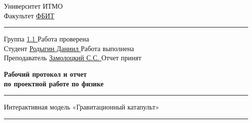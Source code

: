 \documentclass[12pt,a4paper]{article}
\begin{document}
\noindent
\begin{minipage}[t]{0.6\textwidth}
    \vspace{0pt}
    Университет ИТМО \\
    Факультет \underline{\hspace{0.6cm} ФБИТ \hspace{5.95cm}}
\end{minipage}%
\hfill%
\begin{minipage}[t]{0.3\textwidth}
    \vspace{-14pt}
    \centering
\end{minipage}
\rule{\textwidth}{1.5pt}
\vspace{0.01cm}

\noindent
Группа \underline{\hspace{1cm} 1.1 \hspace{2.85cm}} \hfill Работа проверена \underline{\hspace{4cm}}\\
Студент \underline{\hspace{0.2cm} Родыгин Даниил \hspace{0.2cm}} \hfill Работа выполнена \underline{\hspace{3.4cm}}\\
Преподаватель \underline{\hspace{0.935cm} Замолоцкий С.С. \hspace{1.5cm}} \hfill Отчет принят \underline{\hspace{4.84cm}}\\

\vspace{0.01cm}

\begin{center}
    \Large\textbf{Рабочий протокол и отчет} \\
    \Large\textbf{по проектной работе по физике}
\end{center}
\noindent\rule{\textwidth}{1.5pt}%
\vspace{-0.3cm}
\begin{center}
Интерактивная модель «Гравитационный катапульт»
\end{center}
\vspace{-0.3cm}
\noindent\rule{\textwidth}{1.5pt}
\end{document}
